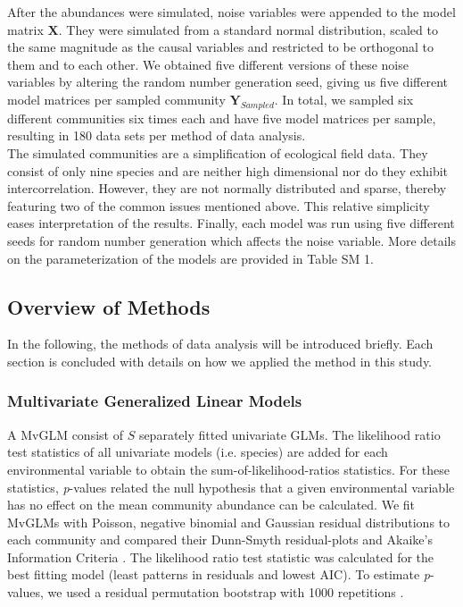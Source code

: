 \documentclass[a4paper,11pt]{article}
\begin{document}
	    
		After the abundances were simulated, noise variables were appended to the model matrix $\mathbf{X}$.
		They were simulated from a standard normal distribution, scaled to the same magnitude as the causal variables and restricted to be orthogonal to them and to each other.  
	    We obtained five different versions of these noise variables by altering the random number generation seed,  giving us five different model matrices per sampled community $\mathbf{Y}_{Sampled}$.  
	    In total, we sampled six different communities six times each and have five model matrices per sample, resulting in 180 data sets per method of data analysis.\\
        The simulated communities are a simplification of ecological field data. 
        They consist of only nine species and are neither high dimensional nor do they exhibit intercorrelation.
        However, they are not normally distributed and sparse, thereby featuring two of the common issues mentioned above. 
        This relative simplicity eases interpretation of the results.
        Finally, each model was run using five different seeds for random number generation which affects the noise variable. 
        More details on the parameterization of the models are provided in Table SM 1.

    
    \subsection*{Overview of Methods}
        
        In the following, the methods of data analysis will be introduced briefly. 
        Each section is concluded with details on how we applied the method in this study.  \\
        \subsubsection{Multivariate Generalized Linear Models}
		A MvGLM consist of $S$ separately fitted univariate GLMs. 
		The likelihood ratio test statistics of all univariate models (i.e. species) are added for each environmental variable to obtain the sum-of-likelihood-ratios statistics.  
		For these statistics, \textit{p}-values related the null hypothesis that a given environmental variable has no effect on the mean community abundance can be calculated. 
		We fit MvGLMs with Poisson, negative binomial and Gaussian residual distributions to each community and compared their Dunn-Smyth residual-plots \citep{dunn1996randomized} and Akaike's Information Criteria \cite[AIC, ][]{akaike1974new}.
		The likelihood ratio test statistic was calculated for the best fitting model (least patterns in residuals and lowest AIC).
	    To estimate \textit{p}-values, we used a residual permutation bootstrap with 1000 repetitions \citep{davidsonbootstrap}.
	
\end{document}
